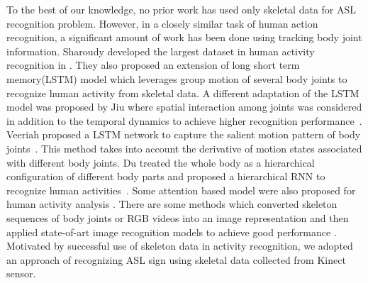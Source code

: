 \documentclass[10pt,twocolumn,letterpaper]{article}
\begin{document}
To the best of our knowledge, no prior work has used only skeletal data for ASL recognition problem. However, in a closely similar task of human action recognition, a significant amount of work has been done using tracking body joint information. Sharoudy \etal developed the largest dataset in human activity recognition in \cite{7780484}. They also proposed an extension of long short term memory(LSTM) model which leverages group motion of several body joints to recognize human activity from skeletal data. A different adaptation of the LSTM model was proposed by Jiu \etal where spatial interaction among joints was considered in addition to the temporal dynamics to achieve higher recognition performance~\cite{8101019}. Veeriah \etal proposed a LSTM network to capture the salient motion pattern of body joints~\cite{7410817}. This method takes into account the derivative of motion states associated with different body joints. Du \etal treated the whole body as a hierarchical configuration of different body parts and proposed a hierarchical RNN to recognize human activities~\cite{7298714}. Some attention based model were also proposed for human activity analysis \cite{8226767, song2016end}. There are some methods which converted skeleton sequences of body joints or RGB videos into an image representation and then applied state-of-art image recognition models to achieve good performance \cite{DBLP:conf/cvpr/KeBASB17, DBLP:journals/corr/abs-1711-05941}.
Motivated by successful use of skeleton data in activity recognition, we adopted an approach of recognizing ASL sign using skeletal data collected from Kinect sensor.  
\end{document}
